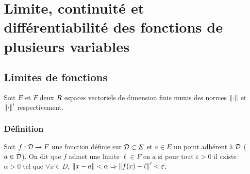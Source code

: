 \chapter[Limite, continuité et différentiabilité]{Limite, continuité et différentiabilité des fonctions de plusieurs variables}



\section{Limites de fonctions}


Soit $E$ et $F$ deux $R$ espaces vectoriels de dimension finie munis des normes $\left\lVert\cdot\right\rVert$ et $\left\lVert\cdot\right\rVert'$ respectivement.

\sld{\vfill\pagebreak[5]}%
\subsection{Définition}

\begin{definition}
    Soit $f:\mathcal{D}\to F$ une fonction définie sur $\mathcal{D} \subset E$ et $a\in E$ un point adhérent à $\mathcal{D}$ (\ie $a\in \bar{\mathcal{D}}$). On dit que $f$ admet une limite $\ell \in F$ en $a$ si pour tout $\varepsilon>0$ il existe $\alpha>0$ tel que $\forall x \in D$, $\left\lVert x - a\right\rVert < \alpha \Rightarrow  \left\lVert f(x) - \ell\right\rVert' < \varepsilon$.  
\end{definition}

